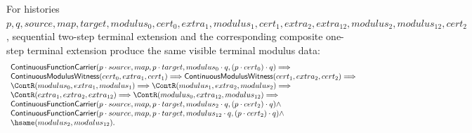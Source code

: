 \begin{theorem}
\label{thm:continuous-function-carrier-visible-terminal-modulus-reassociation}
For histories
$p,q,source,map,target,modulus_0,cert_0,extra_1,modulus_1,cert_1,
extra_2,extra_{12},modulus_2,modulus_{12},cert_2$, sequential two-step terminal
extension and the corresponding composite one-step terminal extension produce
the same visible terminal modulus data:
$$
\begin{array}{l}
\mathsf{ContinuousFunctionCarrier}(p\cdot source,map,p\cdot target,
modulus_0\cdot q,(p\cdot cert_0)\cdot q)
\Longrightarrow\\
\mathsf{ContinuousModulusWitness}(cert_0,extra_1,cert_1)
\Longrightarrow
\mathsf{ContinuousModulusWitness}(cert_1,extra_2,cert_2)
\Longrightarrow\\
\ContR(modulus_0,extra_1,modulus_1)
\Longrightarrow
\ContR(modulus_1,extra_2,modulus_2)
\Longrightarrow\\
\ContR(extra_1,extra_2,extra_{12})
\Longrightarrow
\ContR(modulus_0,extra_{12},modulus_{12})
\Longrightarrow\\
\mathsf{ContinuousFunctionCarrier}(p\cdot source,map,p\cdot target,
modulus_2\cdot q,(p\cdot cert_2)\cdot q)
\land\\
\mathsf{ContinuousFunctionCarrier}(p\cdot source,map,p\cdot target,
modulus_{12}\cdot q,(p\cdot cert_2)\cdot q)
\land\\
\hsame(modulus_2,modulus_{12}).
\end{array}
$$
\end{theorem}

